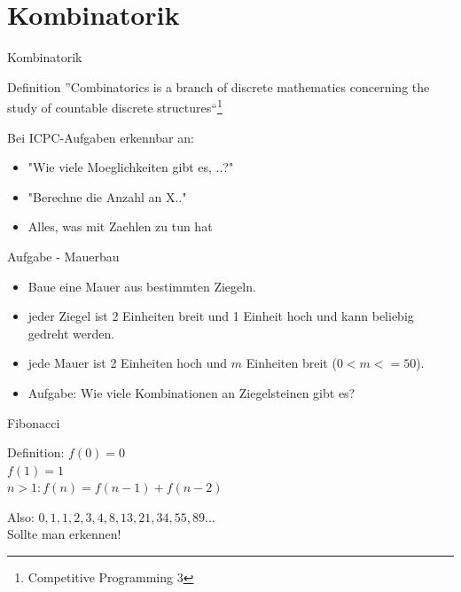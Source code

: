 \documentclass[18pt]{beamer}
\begin{document}
\section{Kombinatorik}


\begin{frame}{Kombinatorik}
\begin{block}{Definition}
	''Combinatorics is a branch of discrete mathematics concerning the study of countable discrete structures``\footnote{Competitive Programming 3}
\end{block}

Bei ICPC-Aufgaben erkennbar an:
\begin{itemize}
	\item "Wie viele Moeglichkeiten gibt es, ..?"
	\item "Berechne die Anzahl an X.."
	\item Alles, was mit Zaehlen zu tun hat
\end{itemize}
\end{frame}


\begin{frame}{Aufgabe - Mauerbau}
\begin{itemize}
	\item Baue eine Mauer aus bestimmten Ziegeln.
	\item jeder Ziegel ist 2 Einheiten breit und 1 Einheit hoch und kann beliebig gedreht werden.
	\item jede Mauer ist 2 Einheiten hoch und \(m\) Einheiten breit (\(0<m<=50\)). 
	\item Aufgabe: Wie viele Kombinationen an Ziegelsteinen gibt es?
\end{itemize}
\end{frame}


\begin{frame}{Fibonacci}
\begin{block}{Definition:}
\(f(0)=0\)\\
\(f(1)=1\)\\
\(n>1: f(n)=f(n-1)+f(n-2)\)\\
\end{block}
Also: \(0, 1, 1, 2, 3, 4, 8, 13, 21, 34, 55, 89...\)\\

Sollte man erkennen!
\end{frame}
\end{document}
